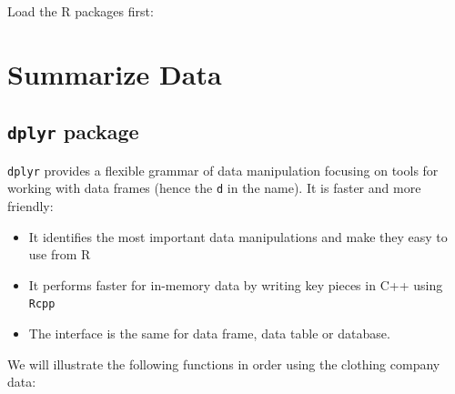 \documentclass[12pt,]{krantz}
\makeatletter
\newenvironment{Shaded}{\begin{snugshade}}{\end{snugshade}}
\newcommand{\CommentTok}[1]{\textcolor[rgb]{0.37,0.37,0.37}{\textit{#1}}}
\newcommand{\ControlFlowTok}[1]{\textcolor[rgb]{0.27,0.27,0.27}{\textbf{#1}}}
\newcommand{\DataTypeTok}[1]{\textcolor[rgb]{0.27,0.27,0.27}{#1}}
\newcommand{\DecValTok}[1]{\textcolor[rgb]{0.06,0.06,0.06}{#1}}
\newcommand{\KeywordTok}[1]{\textcolor[rgb]{0.27,0.27,0.27}{\textbf{#1}}}
\newcommand{\NormalTok}[1]{#1}
\newcommand{\OperatorTok}[1]{\textcolor[rgb]{0.43,0.43,0.43}{\textbf{#1}}}
\newcommand{\OtherTok}[1]{\textcolor[rgb]{0.37,0.37,0.37}{#1}}
\newcommand{\StringTok}[1]{\textcolor[rgb]{0.5,0.5,0.5}{#1}}
\providecommand{\tightlist}{%
  \setlength{\itemsep}{0pt}\setlength{\parskip}{0pt}}
\newenvironment{kframe}{%
\medskip{}
\setlength{\fboxsep}{.8em}
 \def\at@end@of@kframe{}%
 \ifinner\ifhmode%
  \def\at@end@of@kframe{\end{minipage}}%
  \begin{minipage}{\columnwidth}%
 \fi\fi%
 \def\FrameCommand##1{\hskip\@totalleftmargin \hskip-\fboxsep
 \colorbox{shadecolor}{##1}\hskip-\fboxsep
     \hskip-\linewidth \hskip-\@totalleftmargin \hskip\columnwidth}%
 \MakeFramed {\advance\hsize-\width
   \@totalleftmargin\z@ \linewidth\hsize
   \@setminipage}}%
 {\par\unskip\endMakeFramed%
 \at@end@of@kframe}
\renewenvironment{Shaded}{\begin{kframe}}{\end{kframe}}
\makeatother
\begin{document}
Load the R packages first:

\begin{Shaded}
\end{Shaded}

\hypertarget{summarize-data}{%
\section{Summarize Data}\label{summarize-data}}

\hypertarget{dplyr-package}{%
\subsection{\texorpdfstring{\texttt{dplyr} package}{dplyr package}}\label{dplyr-package}}

\texttt{dplyr} provides a flexible grammar of data manipulation focusing on tools for working with data frames (hence the \texttt{d} in the name). It is faster and more friendly:

\begin{itemize}
\tightlist
\item
  It identifies the most important data manipulations and make they easy to use from R
\item
  It performs faster for in-memory data by writing key pieces in C++ using \texttt{Rcpp}
\item
  The interface is the same for data frame, data table or database.
\end{itemize}

We will illustrate the following functions in order using the clothing company data:
\end{document}
